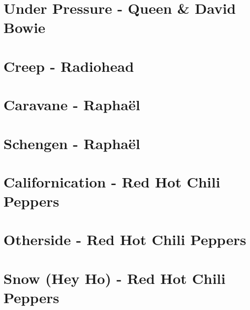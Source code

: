 \documentclass[11pt]{article}
\begin{document}
\section{Under Pressure - Queen \& David Bowie}
\begin{guitar}

\end{guitar}

\section{Creep - Radiohead}
\begin{guitar}

\end{guitar}

\section{Caravane - Raphaël}
\begin{guitar}

\end{guitar}

\section{Schengen - Raphaël}
\begin{guitar}

\end{guitar}

\section*{Californication - Red Hot Chili Peppers}
\begin{guitar}

\end{guitar}

\section*{Otherside - Red Hot Chili Peppers}
\begin{guitar}

\end{guitar}

\section{Snow  (Hey Ho) - Red Hot Chili Peppers}
\begin{guitar}

\end{guitar}
\end{document}
